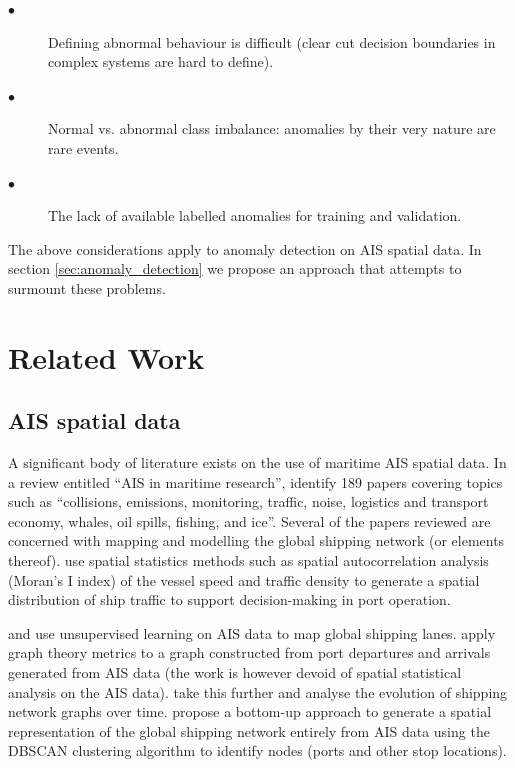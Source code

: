 \documentclass{mldsmsc}
\begin{document}
\begin{description}
	\item [$\bullet$] Defining abnormal behaviour is difficult (clear cut decision boundaries in complex systems are hard to define).
	\item [$\bullet$] Normal vs. abnormal class imbalance: anomalies by their very nature are rare events.
	\item [$\bullet$] The lack of available labelled anomalies for training and validation.
\end{description}

The above considerations apply to anomaly detection on AIS spatial data. In section \ref{sec:anomaly_detection} we propose an approach that attempts to surmount these problems.

\section{Related Work}
\subsection{AIS spatial data}
A significant body of literature exists on the use of maritime AIS spatial data. In a review entitled “AIS in maritime research”, \cite{svanberg_ais_2019}  identify 189 papers covering topics such as “collisions, emissions, monitoring, traffic, noise, logistics and transport economy, whales, oil spills, fishing, and ice”.  Several of the papers reviewed are concerned with mapping and modelling the global shipping network (or elements thereof). \cite{zhang_big_2019} use spatial statistics methods such as spatial autocorrelation analysis (Moran's I index) of the vessel speed and traffic density to generate a spatial distribution of ship traffic to support decision-making in port operation.

\cite{vespe_unsupervised_2012} and \cite{arguedas_automatic_2014} use unsupervised learning on AIS data to map global shipping lanes. \cite{kaluza_complex_2010} apply graph theory metrics to a graph constructed from port departures and arrivals generated from AIS data (the work is however devoid of spatial statistical analysis on the AIS data). \cite{carlini_uncovering_2020} take this further and analyse the evolution of shipping network graphs over time. \cite{wang_extracting_2019} propose a bottom-up approach to generate a spatial representation of the global shipping network entirely from AIS data using the DBSCAN clustering algorithm to identify nodes (ports and other stop locations).
\end{document}
